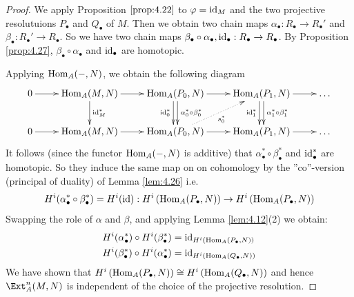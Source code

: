 \documentclass[twoside = false,	%
		headsepline,		%
		parskip = true,
		]{scrbook}						%
\begin{document}
    \begin{proof}
        We apply Proposition $\ref{prop:4.22}$ to $\varphi = \mathrm{id}_M$ and the two projective resolutuions $P_\bullet$ and $Q_\bullet$ of $M$. Then we obtain two chain maps $\alpha_\bullet: R_\bullet \to R_\bullet'$ and $\beta_\bullet: R_\bullet' \to R_\bullet$. So we have two chain maps $\beta_\bullet \circ \alpha_\bullet, \mathrm{id}_\bullet: R_\bullet \to R_\bullet$. By Proposition \ref{prop:4.27}, $\beta_\bullet \circ \alpha_\bullet$ and $\mathrm{id}_\bullet$ are homotopic.

        Applying $\mathrm{Hom}_A(-,N)$, we obtain the following diagram
        \begin{equation*}
        \xymatrix {
            0 \ar[r] & \Hom_A(M,N) \ar[r] \ar[d]^{\id_M^*} & \Hom_A(P_0,N) \ar[r] \ar@<-0.5ex>[d]_{\id_0^*} \ar@<0.5ex>[d]^{\alpha_0^* \circ \beta_0^*} & \Hom_A(P_1,N) \ar[r] \ar@<-0.5ex>[d]_{\id_1^*} \ar@<0.5ex>[d]^{\alpha_1^* \circ \beta_1^*} & \dots \\
            0 \ar[r] & \Hom_A(M,N) \ar[r] & \Hom_A(P_0,N) \ar[r] \ar@{.>}[ur]_{s_0^*} & \Hom_A(P_1,N) \ar[r] & \dots
        }
        \end{equation*}
        It follows (since the functor $\mathrm{Hom}_A(-,N)$ is additive) that $\alpha_\bullet^* \circ \beta_\bullet^*$ and $\mathrm{id}_\bullet^*$ are homotopic. So they induce the same map on on cohomology by the ''co''-version (principal of duality) of Lemma \ref{lem:4.26} i.e.
        \begin{equation*}
            H^i(\alpha_\bullet^* \circ \beta_\bullet^*) = H^i(\mathrm{id}): H^i\left( \mathrm{Hom}_A(P_\bullet,N)\right) \to H^i\left( \mathrm{Hom}_A(P_\bullet,N)\right)
        \end{equation*}
        Swapping the role of $\alpha$ and $\beta$, and applying Lemma \ref{lem:4.12}(2) we obtain:
        \begin{equation*}
        \begin{split}
            H^i(\alpha_\bullet^*) \circ H^i(\beta_\bullet^*) &= \mathrm{id}_{H^i\left( \mathrm{Hom}_A(P_\bullet,N)\right)} \\
            H^i(\beta_\bullet^*) \circ H^i(\alpha_\bullet^*) &= \mathrm{id}_{H^i\left( \mathrm{Hom}_A(Q_\bullet,N)\right)}
        \end{split}
        \end{equation*}
        We have shown that $H^i\left( \mathrm{Hom}_A(P_\bullet,N)\right) \cong H^i\left( \mathrm{Hom}_A(Q_\bullet,N)\right)$ and hence $\Ext_A^n(M,N)$ is independent of the choice of the projective resolution.
    \end{proof}
\end{document}
